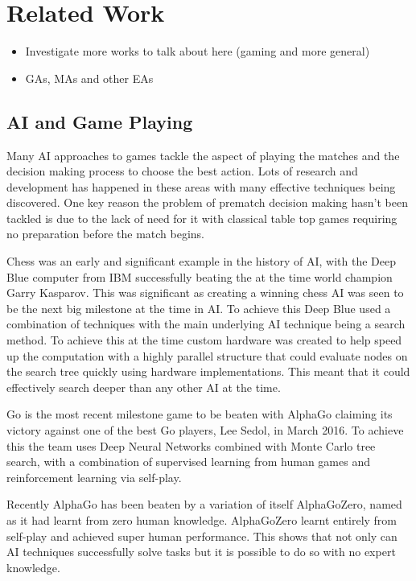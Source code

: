 \documentclass[a4paper]{article}
\begin{document}
\section{Related Work}
\begin{itemize}
   \item Investigate more works to talk about here (gaming and more general)
   \item GAs, MAs and other EAs
\end{itemize}
\subsection{AI and Game Playing}
Many AI approaches to games tackle the aspect of playing the matches and the decision making process to choose the best action.
Lots of research and development has happened in these areas with many effective techniques being discovered.
One key reason the problem of prematch decision making hasn't been tackled is due to the lack of need for it with classical table top games requiring no preparation before the match begins.
\\ \par
Chess was an early and significant example in the history of AI, with the Deep Blue computer from IBM successfully beating the at the time world champion Garry Kasparov\cite{deepBlue}.
This was significant as creating a winning chess AI was seen to be the next big milestone at the time in AI\@.
To achieve this Deep Blue used a combination of techniques with the main underlying AI technique being a search method.
To achieve this at the time custom hardware was created to help speed up the computation with a highly parallel structure that could evaluate nodes on the search tree quickly using hardware implementations.
This meant that it could effectively search deeper than any other AI at the time.
\par
Go is the most recent milestone game to be beaten with AlphaGo claiming its victory against one of the best Go players, Lee Sedol, in March 2016\cite{alphaGo}.
To achieve this the team uses Deep Neural Networks combined with Monte Carlo tree search, with a combination of supervised learning from human games and reinforcement learning via self-play.
\par
Recently AlphaGo has been beaten by a variation of itself AlphaGoZero, named as it had learnt from zero human knowledge\cite{alphaGoZero}.
AlphaGoZero learnt entirely from self-play and achieved super human performance.
This shows that not only can AI techniques successfully solve tasks but it is possible to do so with no expert knowledge.
\end{document}
